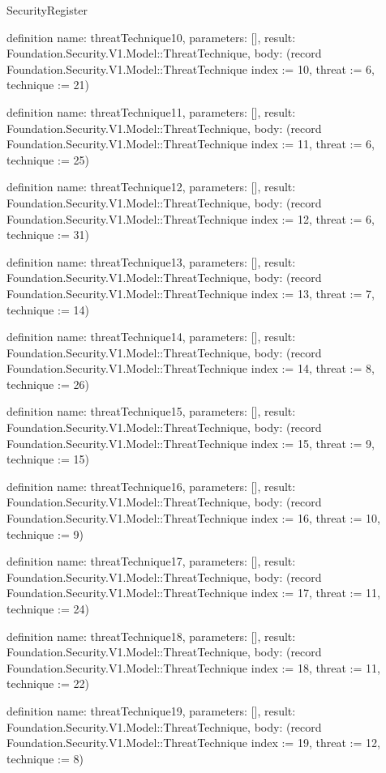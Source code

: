 \begin{lexlean}{SecurityRegister}
\begin{semanticmodule}
definition{
  name: threatTechnique10,
  parameters: [],
  result: Foundation.Security.V1.Model::ThreatTechnique,
  body: (record Foundation.Security.V1.Model::ThreatTechnique {index := 10, threat := 6, technique := 21})
}

definition{
  name: threatTechnique11,
  parameters: [],
  result: Foundation.Security.V1.Model::ThreatTechnique,
  body: (record Foundation.Security.V1.Model::ThreatTechnique {index := 11, threat := 6, technique := 25})
}

definition{
  name: threatTechnique12,
  parameters: [],
  result: Foundation.Security.V1.Model::ThreatTechnique,
  body: (record Foundation.Security.V1.Model::ThreatTechnique {index := 12, threat := 6, technique := 31})
}

definition{
  name: threatTechnique13,
  parameters: [],
  result: Foundation.Security.V1.Model::ThreatTechnique,
  body: (record Foundation.Security.V1.Model::ThreatTechnique {index := 13, threat := 7, technique := 14})
}

definition{
  name: threatTechnique14,
  parameters: [],
  result: Foundation.Security.V1.Model::ThreatTechnique,
  body: (record Foundation.Security.V1.Model::ThreatTechnique {index := 14, threat := 8, technique := 26})
}

definition{
  name: threatTechnique15,
  parameters: [],
  result: Foundation.Security.V1.Model::ThreatTechnique,
  body: (record Foundation.Security.V1.Model::ThreatTechnique {index := 15, threat := 9, technique := 15})
}

definition{
  name: threatTechnique16,
  parameters: [],
  result: Foundation.Security.V1.Model::ThreatTechnique,
  body: (record Foundation.Security.V1.Model::ThreatTechnique {index := 16, threat := 10, technique := 9})
}

definition{
  name: threatTechnique17,
  parameters: [],
  result: Foundation.Security.V1.Model::ThreatTechnique,
  body: (record Foundation.Security.V1.Model::ThreatTechnique {index := 17, threat := 11, technique := 24})
}

definition{
  name: threatTechnique18,
  parameters: [],
  result: Foundation.Security.V1.Model::ThreatTechnique,
  body: (record Foundation.Security.V1.Model::ThreatTechnique {index := 18, threat := 11, technique := 22})
}

definition{
  name: threatTechnique19,
  parameters: [],
  result: Foundation.Security.V1.Model::ThreatTechnique,
  body: (record Foundation.Security.V1.Model::ThreatTechnique {index := 19, threat := 12, technique := 8})
}


\end{semanticmodule}
\end{lexlean}
